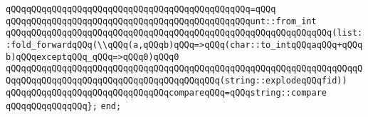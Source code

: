 \verb|qQQqqQQqqQQqqQQqqQQqqQQqqQQqqQQqqQQqqQQqqQQqqQQq=qQQq|\newline
\verb|qQQqqQQqqQQqqQQqqQQqqQQqqQQqqQQqqQQqqQQqqQQqqQQqunt::from_int|\newline
\verb|qQQqqQQqqQQqqQQqqQQqqQQqqQQqqQQqqQQqqQQqqQQqqQQqqQQqqQQqqQQqqQQq(list::fold_forwardqQQq(\\qQQq(a,qQQqb)qQQq=>qQQq(char::to_intqQQqaqQQq+qQQqb)qQQqexceptqQQq_qQQq=>qQQq0)qQQq0|\newline
\verb|qQQqqQQqqQQqqQQqqQQqqQQqqQQqqQQqqQQqqQQqqQQqqQQqqQQqqQQqqQQqqQQqqQQqqQQqqQQqqQQqqQQqqQQqqQQqqQQqqQQqqQQqqQQqqQQq(string::explodeqQQqfid))|\newline
\newline
\verb|qQQqqQQqqQQqqQQqqQQqqQQqqQQqqQQqcompareqQQq=qQQqstring::compare|\newline
\verb|qQQqqQQqqQQqqQQq};|\newline
\verb|end;|\newline
\newline
\newline

